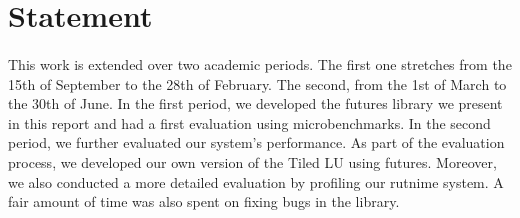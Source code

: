 \section*{Statement}
\paragraph{}
This work is extended over two academic periods.  The first one stretches 
from the 15th of September to the 28th of February.  The second, from the
1st of March to the 30th of June.  In the first period, we developed the futures 
library we present in this report and had a first evaluation using microbenchmarks.
In the second period, we further evaluated our system's performance. As part of the
evaluation process, we developed our own version of the Tiled LU using futures.
Moreover, we also conducted a more detailed evaluation by profiling our rutnime
system.  A fair amount of time was also spent on fixing bugs in the library.

